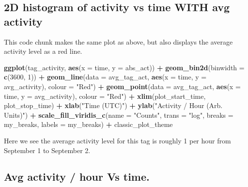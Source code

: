 \documentclass[
]{book}
\newenvironment{Shaded}{\begin{snugshade}}{\end{snugshade}}
\newcommand{\AttributeTok}[1]{\textcolor[rgb]{0.13,0.29,0.53}{#1}}
\newcommand{\DecValTok}[1]{\textcolor[rgb]{0.00,0.00,0.81}{#1}}
\newcommand{\FunctionTok}[1]{\textcolor[rgb]{0.13,0.29,0.53}{\textbf{#1}}}
\newcommand{\NormalTok}[1]{#1}
\newcommand{\SpecialCharTok}[1]{\textcolor[rgb]{0.81,0.36,0.00}{\textbf{#1}}}
\newcommand{\StringTok}[1]{\textcolor[rgb]{0.31,0.60,0.02}{#1}}
\begin{document}
\subsection{2D histogram of activity vs time WITH avg activity}\label{d-histogram-of-activity-vs-time-with-avg-activity}

This code chunk makes the same plot as above, but also displays the average activity level as a red line.

\begin{Shaded}
\begin{Highlighting}[]
\FunctionTok{ggplot}\NormalTok{(tag\_activity, }
       \FunctionTok{aes}\NormalTok{(}\AttributeTok{x =}\NormalTok{ time, }
           \AttributeTok{y =}\NormalTok{ abs\_act)) }\SpecialCharTok{+}
 \FunctionTok{geom\_bin2d}\NormalTok{(}\AttributeTok{binwidth =} \FunctionTok{c}\NormalTok{(}\DecValTok{3600}\NormalTok{, }\DecValTok{1}\NormalTok{)) }\SpecialCharTok{+}
  \FunctionTok{geom\_line}\NormalTok{(}\AttributeTok{data =}\NormalTok{ avg\_tag\_act, }
            \FunctionTok{aes}\NormalTok{(}\AttributeTok{x =}\NormalTok{ time, }
                \AttributeTok{y =}\NormalTok{ avg\_activity),}
            \AttributeTok{colour =} \StringTok{"Red"}\NormalTok{) }\SpecialCharTok{+}
  \FunctionTok{geom\_point}\NormalTok{(}\AttributeTok{data =}\NormalTok{ avg\_tag\_act, }
             \FunctionTok{aes}\NormalTok{(}\AttributeTok{x =}\NormalTok{ time, }
                 \AttributeTok{y =}\NormalTok{ avg\_activity), }
             \AttributeTok{colour =} \StringTok{"Red"}\NormalTok{) }\SpecialCharTok{+}
  \FunctionTok{xlim}\NormalTok{(plot\_start\_time, }
\NormalTok{       plot\_stop\_time) }\SpecialCharTok{+}
  \FunctionTok{xlab}\NormalTok{(}\StringTok{"Time (UTC)"}\NormalTok{) }\SpecialCharTok{+}
  \FunctionTok{ylab}\NormalTok{(}\StringTok{"Activity / Hour (Arb. Units)"}\NormalTok{) }\SpecialCharTok{+}
  \FunctionTok{scale\_fill\_viridis\_c}\NormalTok{(}\AttributeTok{name =} \StringTok{"Counts"}\NormalTok{, }
                       \AttributeTok{trans =} \StringTok{"log"}\NormalTok{, }
                       \AttributeTok{breaks =}\NormalTok{ my\_breaks, }
                       \AttributeTok{labels =}\NormalTok{ my\_breaks) }\SpecialCharTok{+}
\NormalTok{  classic\_plot\_theme}
\end{Highlighting}
\end{Shaded}

Here we see the average activity level for this tag is roughly 1 per hour from September 1 to September 2.

\subsection{Avg activity / hour Vs time.}\label{avg-activity-hour-vs-time.}
\end{document}
